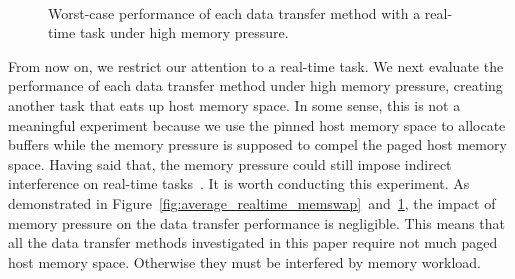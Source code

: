 \begin{figure}
 \begin{center}
  \\
  \caption{Worst-case performance of each data transfer method with a
  real-time task under high memory pressure.}
  \label{fig:worst_realtime_memswap}
 \end{center}
\end{figure}

From now on, we restrict our attention to a real-time task.
We next evaluate the performance of each data transfer method under high
memory pressure, creating another task that eats up host memory space.
In some sense, this is not a meaningful experiment because we use the
pinned host memory space to allocate buffers while the memory pressure
is supposed to compel the paged host memory space.
Having said that, the memory pressure could still impose indirect
interference on real-time tasks~\cite{Kato_RTSJ11, Yang_OSDI08}.
It is worth conducting this experiment.
As demonstrated in
Figure~\ref{fig:average_realtime_memswap}~and~\ref{fig:worst_realtime_memswap},
the impact of memory pressure on the data transfer performance is
negligible.
This means that all the data transfer methods investigated in this paper
require not much paged host memory space.
Otherwise they must be interfered by memory workload.

